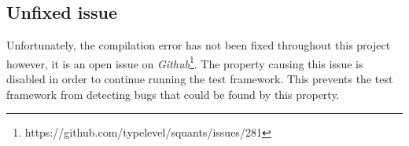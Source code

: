 \subsection*{Unfixed issue}
Unfortunately, the compilation error has not been fixed throughout this project
however, it is an open issue on
\textit{Github}\footnote{https://github.com/typelevel/squants/issues/281}. The
property causing this issue is disabled in order to continue running the test
framework. This prevents the test framework from detecting bugs that could be
found by this property.
